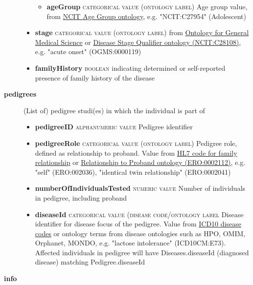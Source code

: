 \documentclass[a4paper, 10pt]{article}        %
\begin{document}
\begin{description}
\begin{itemize}
\begin{itemize}
			\item[] \textbf{ageGroup} {\textsc{categorical value (ontology label)}} Age group value, from \href{https://www.ebi.ac.uk/ols/ontologies/ncit/terms?iri=http%3A%2F%2Fpurl.obolibrary.org%2Fobo%2FNCIT_C20587}{NCIT Age Group ontology}, e.g. "NCIT:C27954" (Adolescent)
			\end{itemize}
			\item[]  \textbf{stage} {\textsc{categorical value (ontology label)}} from  \href{https://www.ebi.ac.uk/ols/ontologies/ogms}{Ontology for General Medical Science} or  \href{https://www.ebi.ac.uk/ols/ontologies/ncit/terms?iri=http%3A%2F%2Fpurl.obolibrary.org%2Fobo%2FNCIT_C28108}{Disease Stage Qualifier ontology (NCIT:C28108)}, e.g. "acute onset" (OGMS:0000119)
			\item[] \textbf{familyHistory} {\textsc{boolean}} indicating determined or self-reported presence of family history of the disease
	\end{itemize}
	\item[\textbf{pedigrees}] (List of) pedigree studi(es) in which the individual is part of
	\begin{itemize}
			\item[] \textbf{pedigreeID} {\textsc{alphanumeric value}} Pedigree identifier
			\item[] \textbf{pedigreeRole} {\textsc{categorical value (ontology label)}} Pedigree role, defined as relationship to proband. Value from \href{https://www.hl7.org/implement/standards/fhir/2013Sep/familial-relationship.htm}{HL7 code for family relationship} or \href{https://www.ebi.ac.uk/ols/ontologies/ero/terms?iri=http%3A%2F%2Fpurl.obolibrary.org%2Fobo%2FERO_0002112}{Relationship to Proband ontology (ERO:0002112)}, e.g. "self" (ERO:002036), "identical twin relationship" (ERO:0002041)
			\item[] \textbf{numberOfIndividualsTested} {\textsc{numeric value}} Number of individuals in pedigree, including proband
			\item[] \textbf{diseaseId} {\textsc{categorical value (disease code/ontology label}} Disease identifier for disease focus of the pedigree. Value from \href{https://www.who.int/classifications/icd/en/}{ICD10 disease codes} or ontology terms from disease ontologies such as HPO, OMIM, Orphanet, MONDO, e.g. "lactose intolerance" (ICD10CM:E73). Affected individuals in pedigree will have Diseases.diseaseId (diagnosed disease) matching Pedigree.diseaseId
	\end{itemize}

\item[\textbf{info}] 

 \end{description}
\end{document}
